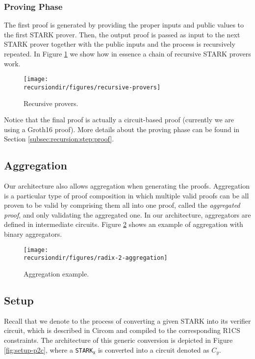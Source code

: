 \subsubsection{Proving Phase \label{subsubsec:proving:phase:intro}}


The first proof is generated by providing the proper inputs and public values to the first STARK prover. Then, the output proof is passed as input to the next STARK prover together with the public inputs and the process is recursively repeated.
In Figure \ref{fig:recursive-provers} we show how in essence a chain of recursive STARK provers work.

\begin{figure}[H]
\centering
\texttt{[image: \\recursiondir/figures/recursive-provers]}
\caption{Recursive provers.}
\label{fig:recursive-provers}
\end{figure}

Notice that the final proof is actually a circuit-based proof (currently we are using a Groth16 proof). More details about the proving phase can be found in Section \ref{subsec:recursion:step:proof}.


\subsection{Aggregation} 

Our architecture also allows aggregation when generating the proofs. Aggregation is a particular type of proof composition in which multiple valid proofs can be all proven to be valid by comprising them all into one proof, called the \textit{aggregated proof}, and only validating the aggregated one.
In our architecture, aggregators are defined in intermediate circuits.
Figure \ref{fig:aggregation_example} shows an example of aggregation with binary aggregators.
\begin{figure}[H]
\centering
\texttt{[image: \\recursiondir/figures/radix-2-aggregation]}
\caption{Aggregation example.}
\label{fig:aggregation_example}
\end{figure}


\subsection{Setup \stoc \label{subsec:stoc}}

Recall that we denote \stoc to the process of converting a given STARK into its verifier circuit, which is described in Circom and compiled to the corresponding R1CS constraints. The architecture of this generic conversion is depicted in Figure \ref{fig:setup-p2c}, where a \texttt{STARK}$_\texttt{x}$ is converted into a circuit denoted as $C_y$.



